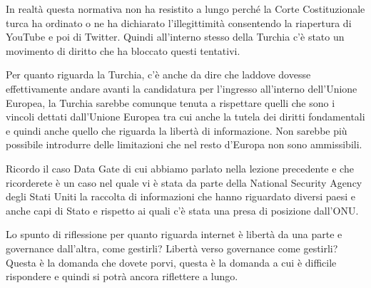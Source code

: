  In realtà questa normativa non ha resistito a lungo perché la Corte Costituzionale turca ha ordinato o ne ha dichiarato l'illegittimità consentendo la riapertura di YouTube e poi di Twitter. Quindi all'interno stesso della Turchia c'è stato un movimento di diritto che ha bloccato questi tentativi.\par
  Per quanto riguarda la Turchia, c'è anche da dire che laddove dovesse effettivamente andare avanti la candidatura per l'ingresso all'interno dell'Unione Europea, la Turchia sarebbe comunque tenuta a rispettare quelli che sono i vincoli dettati dall'Unione Europea tra cui anche la tutela dei diritti fondamentali e quindi anche quello che riguarda la libertà di informazione. Non sarebbe più possibile introdurre delle limitazioni che nel resto d'Europa non sono ammissibili.\par
  Ricordo il caso Data Gate di cui abbiamo parlato nella lezione precedente e che ricorderete è un caso nel quale vi è stata da parte della National Security Agency degli Stati Uniti la raccolta di informazioni che hanno riguardato diversi paesi e anche capi di Stato e rispetto ai quali c'è stata una presa di posizione dall'ONU.\par
  Lo spunto di riflessione per quanto riguarda internet è libertà da una parte e governance dall'altra, come gestirli? Libertà verso governance come gestirli? Questa è la domanda che dovete porvi, questa è la domanda a cui è difficile rispondere e quindi si potrà ancora riflettere a lungo. 
